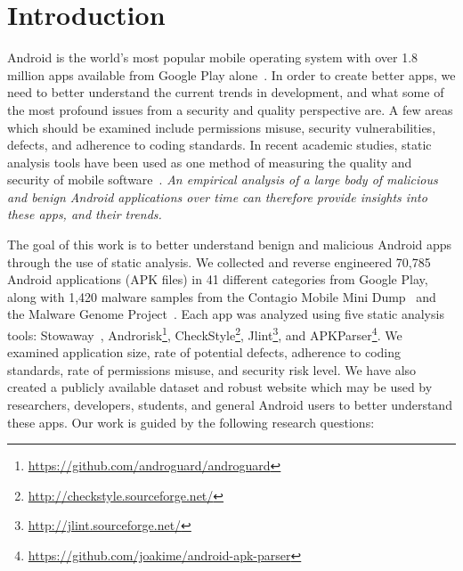 \documentclass{llncs}
\begin{document}
\section{Introduction}

Android is the world's most popular mobile operating system with over 1.8 million apps available from Google Play alone~\cite{statistica_url}. In order to create better apps, we need to better understand the current trends in development, and what some of the most profound issues from a security and quality perspective are. A few areas which should be examined include permissions misuse, security vulnerabilities, defects, and adherence to coding standards. In recent academic studies, static analysis tools have been used as one method of measuring the quality and security of mobile software~\cite{Felt:2011:APD:2046707.2046779,Vidas11curbingandroid,Lee_2013, krutz2015FDroid}. \emph{An empirical analysis of a large body of malicious and benign Android applications over time can therefore provide insights into these apps, and their trends.}


The goal of this work is to better understand benign and malicious Android apps through the use of static analysis. We collected and reverse engineered 70,785  Android applications (APK files) in 41 different categories from Google Play, along with 1,420 malware samples from the Contagio Mobile Mini Dump~\cite{contagio_url} and the Malware Genome Project~\cite{Zhou:2012:DAM:2310656.2310710}. Each app was analyzed using five static analysis tools: Stowaway~\cite{Felt:2011:APD:2046707.2046779}, Androrisk\footnote{\url{https://github.com/androguard/androguard}}, CheckStyle\footnote{\url{http://checkstyle.sourceforge.net/}}, Jlint\footnote{\url{http://jlint.sourceforge.net/}}, and APKParser\footnote{\url{https://github.com/joakime/android-apk-parser}}. We examined application size, rate of potential defects, adherence to coding standards, rate of permissions misuse, and security risk level. We have also created a publicly available dataset and robust website which may be used by researchers, developers, students, and general Android users to better understand these apps. Our work is guided by the following research questions:
\end{document}
